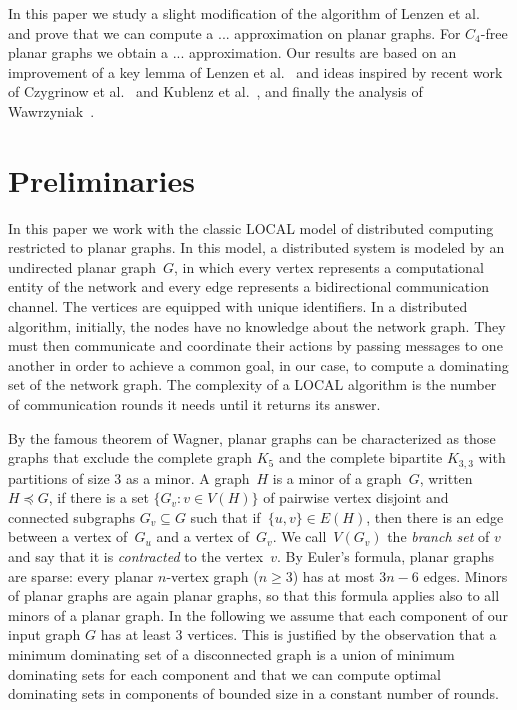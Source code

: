 \documentclass[a4paper,UKenglish,cleveref, autoref, thm-restate]{lipics-v2021}
\newcommand{\minor}{\preceq}
\begin{document}
In this paper we study a slight modification of the algorithm of
Lenzen et al.~\cite{lenzen2013distributed} and prove that we can
compute a ... approximation on planar graphs. For $C_4$-free planar
graphs we obtain a ... approximation. Our results are based
on an improvement of a key lemma of Lenzen et
al.~\cite{lenzen2013distributed} and ideas inspired by
recent work of Czygrinow et  al.~\cite{czygrinow2018distributed} and
Kublenz et al.~\cite{kublenz2020distributed}, and finally the
analysis of Wawrzyniak~\cite{wawrzyniak2014strengthened}.

\section{Preliminaries}

In this paper we work with the classic LOCAL model of distributed computing
restricted to planar graphs.
In this model, a distributed system is modeled by an undirected planar
graph~$G$,
in which every vertex represents a computational entity of the network and every edge represents a bidirectional communication channel. The vertices are equipped with unique identifiers.
In a distributed algorithm, initially, the nodes have no knowledge about
the network graph. They must then communicate and coordinate
their actions by passing messages to one another in order to achieve
a common goal, in our case, to compute a dominating set of the
network graph. The complexity of a LOCAL algorithm is the number of communication rounds it needs until it returns its answer.

By the famous theorem of Wagner, planar graphs can be characterized
as those graphs that exclude the complete graph $K_5$ and the
complete bipartite $K_{3,3}$ with partitions of size $3$ as a minor.
A graph~$H$ is a minor of a graph~$G$, written~$H\minor G$, if
there is a set \mbox{$\{G_v :v\in V(H)\}$} of pairwise vertex disjoint and
connected subgraphs
$G_v\subseteq G$ such that if~$\{u,v\}\in E(H)$, then there is an edge
between a vertex of~$G_u$ and a vertex of~$G_v$. We call~$V(G_v)$ the
\emph{branch set} of $v$ and say that it is
\emph{contracted} to the vertex~$v$. By Euler's formula, planar graphs
are sparse: every planar $n$-vertex graph ($n\geq 3$) has
at most $3n-6$ edges. Minors of planar graphs are again planar graphs,
so that this formula applies also to all minors of a planar graph. In
the following we assume that each component of our input graph $G$
has at least $3$ vertices. This is justified by the observation that a
minimum dominating set of a disconnected graph is a union of
minimum dominating sets for each component and that we can
compute optimal dominating sets in components of bounded size
in a constant number of rounds.
\end{document}
